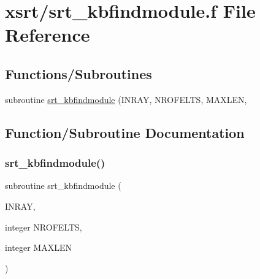\hypertarget{srt__kbfindmodule_8f}{}\section{xsrt/srt\+\_\+kbfindmodule.f File Reference}
\label{srt__kbfindmodule_8f}
\subsection*{Functions/\+Subroutines}
\begin{DoxyCompactItemize}
\item 
subroutine \hyperlink{srt__kbfindmodule_8f_aa383f3bc65b746ae0031b9100374bcb1}{srt\+\_\+kbfindmodule} (I\+N\+R\+AY, N\+R\+O\+F\+E\+L\+TS, M\+A\+X\+L\+EN,
\end{DoxyCompactItemize}


\subsection{Function/\+Subroutine Documentation}
\mbox{\label{srt__kbfindmodule_8f_aa383f3bc65b746ae0031b9100374bcb1}} 
\subsubsection{\texorpdfstring{srt\+\_\+kbfindmodule()}{srt\_kbfindmodule()}}
{\footnotesize\ttfamily subroutine srt\+\_\+kbfindmodule (\begin{DoxyParamCaption}\item[{}]{I\+N\+R\+AY,  }\item[{integer}]{N\+R\+O\+F\+E\+L\+TS,  }\item[{integer}]{M\+A\+X\+L\+EN }\end{DoxyParamCaption})}

